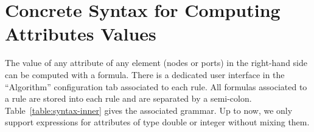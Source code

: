 \documentclass[a4paper,10pt,runningheads]{llncs}
\begin{document}
\section*{Concrete Syntax for Computing Attributes Values}\label{app:inner}
The value of any attribute of any element (nodes or ports) in the right-hand side can be computed with a formula.
There is a dedicated user interface in the ``Algorithm'' configuration tab associated to each 
rule. All formulas associated to a rule are stored into each rule and are separated by a semi-colon.
Table~\ref{table:syntax-inner} gives the 
associated grammar. 
Up to now, we only support 
expressions for attributes of type double or integer without mixing them. 
\end{document}

